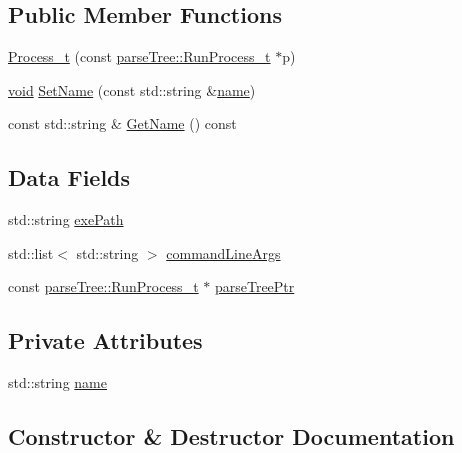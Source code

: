 \subsection*{Public Member Functions}
\begin{DoxyCompactItemize}
\item 
\hyperlink{structmodel_1_1_process__t_a610972da0edecc395b3f7245d815b3d0}{Process\+\_\+t} (const \hyperlink{structparse_tree_1_1_run_process__t}{parse\+Tree\+::\+Run\+Process\+\_\+t} $\ast$p)
\item 
\hyperlink{_t_e_m_p_l_a_t_e__cdef_8h_ac9c84fa68bbad002983e35ce3663c686}{void} \hyperlink{structmodel_1_1_process__t_ac7c3a0271bf16448f8ef2f70d382a392}{Set\+Name} (const std\+::string \&\hyperlink{structmodel_1_1_process__t_affa257a763099deb8c37763725720cda}{name})
\item 
const std\+::string \& \hyperlink{structmodel_1_1_process__t_a47e815d799ec2a47a563db56ee1164e0}{Get\+Name} () const 
\end{DoxyCompactItemize}
\subsection*{Data Fields}
\begin{DoxyCompactItemize}
\item 
std\+::string \hyperlink{structmodel_1_1_process__t_ab16db4e52d9cb4acbc435ed9dde11b92}{exe\+Path}
\item 
std\+::list$<$ std\+::string $>$ \hyperlink{structmodel_1_1_process__t_abdfbb3593d45e40bc278680a46f868ef}{command\+Line\+Args}
\item 
const \hyperlink{structparse_tree_1_1_run_process__t}{parse\+Tree\+::\+Run\+Process\+\_\+t} $\ast$ \hyperlink{structmodel_1_1_process__t_a5740c1d62fe982fc00ad4f07e03b5abc}{parse\+Tree\+Ptr}
\end{DoxyCompactItemize}
\subsection*{Private Attributes}
\begin{DoxyCompactItemize}
\item 
std\+::string \hyperlink{structmodel_1_1_process__t_affa257a763099deb8c37763725720cda}{name}
\end{DoxyCompactItemize}


\subsection{Constructor \& Destructor Documentation}
